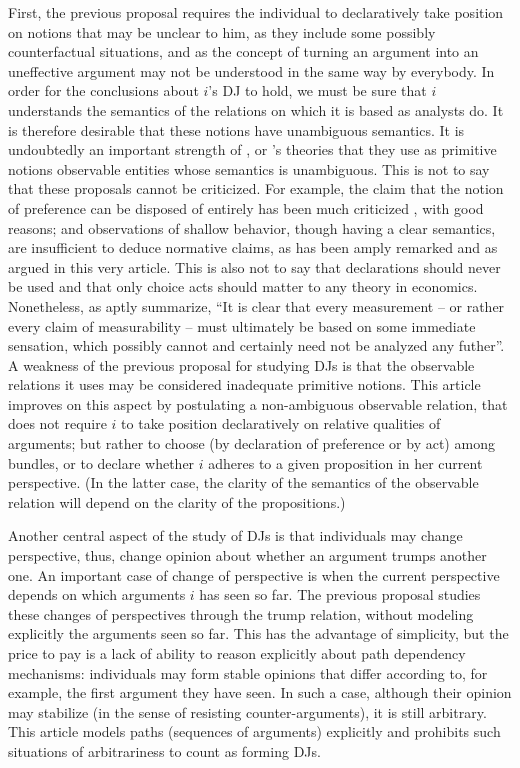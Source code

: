 \documentclass[version=last, pagesize, twoside=off, bibliography=totoc, DIV=calc, fontsize=12pt, a4paper, french, english]{scrartcl}
\begin{document}
First, the previous proposal requires the individual to declaratively take position on notions that may be unclear to him, as they include some possibly counterfactual situations, and as the concept of turning an argument into an uneffective argument may not be understood in the same way by everybody. 
In order for the conclusions about $i$’s \ac{DJ} to hold, we must be sure that $i$ understands the semantics of the relations on which it is based as analysts do. It is therefore desirable that these notions have unambiguous semantics. It is undoubtedly an important strength of \citet{samuelson_foundations_1983}, \citet{von_neumann_theory_2004} or \citet{savage_foundations_1972}’s theories that they use as primitive notions observable entities whose semantics is unambiguous. This is not to say that these proposals cannot be criticized. For example, the claim that the notion of preference can be disposed of entirely has been much criticized \citep{hausman_preference_2011, wong_foundations_2006}, with good reasons; and observations of shallow behavior, though having a clear semantics, are insufficient to deduce normative claims, as has been amply remarked and as argued in this very article. This is also not to say that declarations should never be used and that only choice acts should matter to any theory in economics.
Nonetheless, as \citet[p.\ 16]{von_neumann_theory_2004} aptly summarize, “It is clear that every measurement – or rather every claim of measurability – must ultimately be based on some immediate sensation, which possibly cannot and certainly need not be analyzed any futher”. A weakness of the previous proposal for studying \acp{DJ} is that the observable relations it uses may be considered inadequate primitive notions. This article improves on this aspect by postulating a non-ambiguous observable relation, that does not require $i$ to take position declaratively on relative qualities of arguments; but rather to choose (by declaration of preference or by act) among bundles, or to declare whether $i$ adheres to a given proposition in her current perspective. (In the latter case, the clarity of the semantics of the observable relation will depend on the clarity of the propositions.)

Another central aspect of the study of \acp{DJ} is that individuals may change perspective, thus, change opinion about whether an argument trumps another one. An important case of change of perspective is when the current perspective depends on which arguments $i$ has seen so far. The previous proposal studies these changes of perspectives through the trump relation, without modeling explicitly the arguments seen so far. This has the advantage of simplicity, but the price to pay is a lack of ability to reason explicitly about path dependency mechanisms: individuals may form stable opinions that differ according to, for example, the first argument they have seen. In such a case, although their opinion may stabilize (in the sense of resisting counter-arguments), it is still arbitrary. This article models paths (sequences of arguments) explicitly and prohibits such situations of arbitrariness to count as forming \acp{DJ}.
\end{document}
